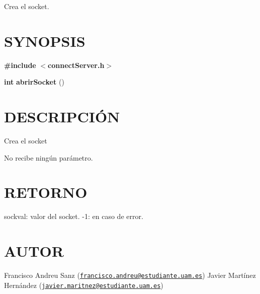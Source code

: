 Crea el socket.\hypertarget{unknown_case_SYNOPSIS}{}\section{S\-Y\-N\-O\-P\-S\-I\-S}\label{unknown_case_SYNOPSIS}
{\bfseries \#include} {\bfseries $<$connect\-Server.\-h$>$} 

{\bfseries int} {\bfseries abrir\-Socket} {\bfseries }({\bfseries })\hypertarget{unknown_case_descripcion}{}\section{D\-E\-S\-C\-R\-I\-P\-C\-IÓ\-N}\label{unknown_case_descripcion}
Crea el socket

No recibe ningún parámetro.\hypertarget{unknown_case_retorno}{}\section{R\-E\-T\-O\-R\-N\-O}\label{unknown_case_retorno}
sockval\-: valor del socket. -\/1\-: en caso de error.\hypertarget{unknown_case_authors}{}\section{A\-U\-T\-O\-R}\label{unknown_case_authors}
Francisco Andreu Sanz (\href{mailto:francisco.andreu@estudiante.uam.es}{\tt francisco.\-andreu@estudiante.\-uam.\-es}) Javier Martínez Hernández (\href{mailto:javier.maritnez@estudiante.uam.es}{\tt javier.\-maritnez@estudiante.\-uam.\-es}) 